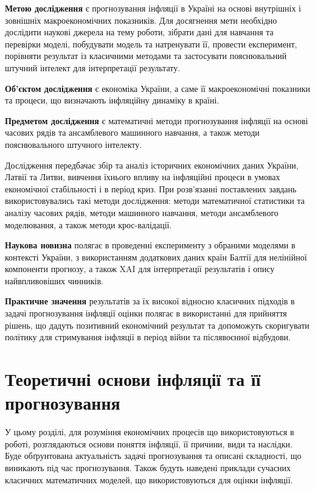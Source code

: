 \documentclass{bachelor_thesis}
\begin{document}
\textbf{Метою дослідження} є прогнозування інфляції в Україні на основі внутрішніх і зовнішніх макроекономічних показників. Для досягнення мети необхідно дослідити наукові джерела на тему роботи, зібрати дані для навчання та перевірки моделі, побудувати модель та натренувати її, провести експеримент, порівняти результат із класичними методами та застосувати пояснювальний штучний інтелект для інтерпретації результату.

\textbf{Об'єктом дослідження} є економіка України, а саме її макроекономічні показники та процеси, що визначають інфляційну динаміку в країні.

\textbf{Предметом дослідження} є математичні методи прогнозування інфляції на основі часових рядів та ансамблевого машинного навчання, а також методи пояснювального штучного інтелекту.

Дослідження передбачає збір та аналіз історичних економічних даних України, Латвії та Литви, вивчення їхнього впливу на інфляційні процеси в умовах економічної стабільності і в період криз. При розв'язанні поставлених завдань використовувались такі методи дослідження: методи математичної статистики та аналізу часових рядів, методи машинного навчання, методи ансамблевого моделювання, а також методи крос-валідації.

\textbf{Наукова новизна} полягає в проведенні експерименту з обраними моделями в контексті України, з використанням додаткових даних країн Балтії для нелінійної компоненти прогнозу, а також XAI для інтерпретації результатів і опису найвпливовіших чинників.

\textbf{Практичне значення} результатів за їх високої відносно класичних підходів в задачі прогнозування інфляції оцінки полягає в використанні для прийняття рішень, що дадуть позитивний економічний результат та допоможуть скоригувати політику для стримування інфляції в період війни та післявоєнної відбудови.

\doublespacing
{}

\chapter{Теоретичні основи інфляції та її прогнозування}

У цьому розділі, для розуміння економічних процесів що використовуються в роботі, розглядаються основи поняття інфляції, її причини, види та наслідки. Буде обґрунтована актуальність задачі прогнозування та описані складності, що виникають під час прогнозування. Також будуть наведені приклади сучасних класичних математичних моделей, що використовуються для оцінки інфляції.
\end{document}
